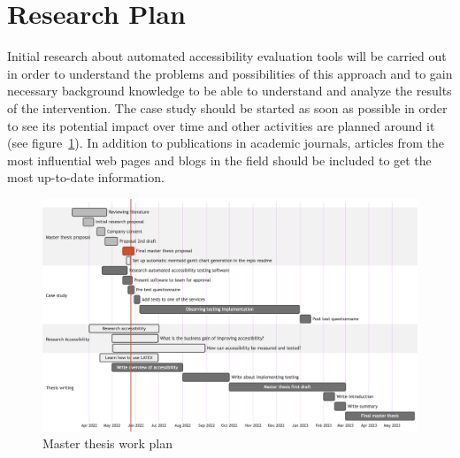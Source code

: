\documentclass{thesis_proposal}
\begin{document}
\section{Research Plan}
Initial research about automated accessibility evaluation tools will be carried out in order to understand the problems and possibilities of this approach and to gain necessary background knowledge to be able to understand and analyze the results of the intervention.
The case study should be started as soon as possible in order to see its potential impact over time and other activities are planned around it (see figure~\ref{fig:plan}).
In addition to publications in academic journals, articles from the most influential web pages and blogs in the field should be included to get the most up-to-date information.
\begin{figure}[ht!]
	\includegraphics[width=1\textwidth]{img/timeline.png}
	\caption{Master thesis work plan}\label{fig:plan}
\end{figure}

\pagebreak
\printbibliography{}
\nocite{*}
\end{document}
